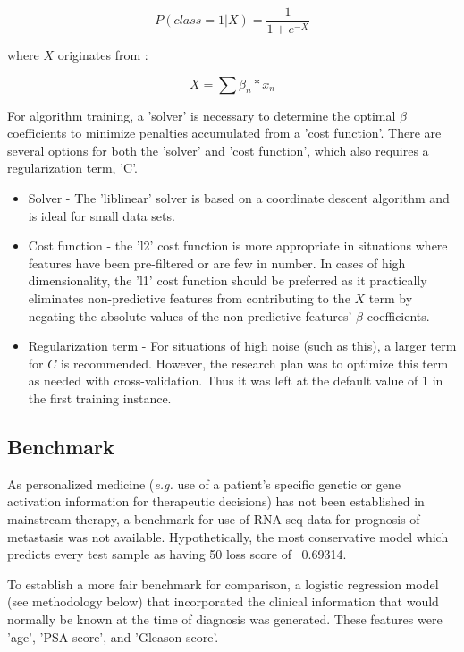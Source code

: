 \documentclass[final]{article}
\begin{document}
$$ P(class = 1 | X) = \frac{1}{1+e^{-X}}$$

where $X$ originates from :

$$ X = \sum{ \beta_{n}*x_{n}} $$

For algorithm training, a 'solver' is necessary to determine the optimal $\beta$
coefficients to minimize penalties accumulated from a 'cost function'.  There are
several options for both the 'solver' and 'cost function', which also requires
a regularization term, 'C'.

\begin{itemize}
  \item Solver - The 'liblinear' solver is based on a coordinate descent algorithm and
  is ideal for small data sets.
  \item Cost function - the 'l2' cost function is more appropriate in situations
  where features have been pre-filtered or are few in number.  In cases of high
  dimensionality, the 'l1' cost function should be preferred as it practically eliminates
  non-predictive features from contributing to the $X$ term by negating the absolute
  values of the non-predictive features' $\beta$ coefficients.
  \item Regularization term - For situations of high noise (such as this), a larger term
  for $C$ is recommended.  However, the research plan was to optimize this term as needed with
  cross-validation.  Thus it was left at the default value of 1 in the first training instance.
\end{itemize}


\subsection{Benchmark}

As personalized medicine (\textit{e.g.} use of a patient's specific genetic or gene
activation information for therapeutic decisions) has not been established in
mainstream therapy, a benchmark for use of RNA-seq data for prognosis of
metastasis was not available.  Hypothetically, the most conservative model which
predicts every test sample as having 50%
loss score of ~0.69314.

To establish a more fair benchmark for comparison, a logistic regression model
(see methodology below) that incorporated the clinical information that would
normally be known at the time of diagnosis was generated.  These features were
'age', 'PSA score', and 'Gleason score'.
\end{document}
